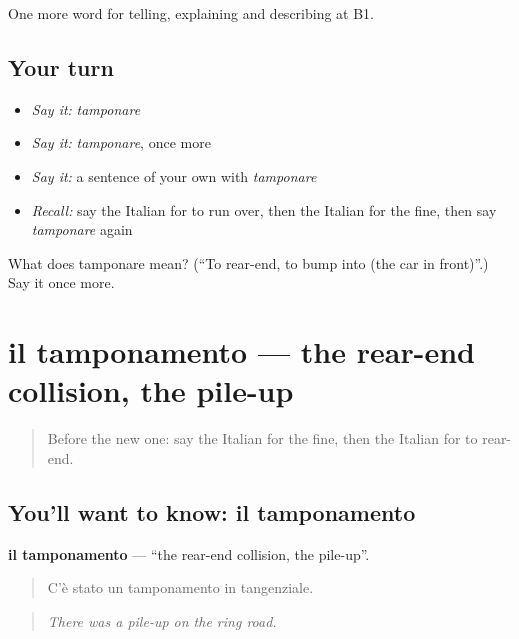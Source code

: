 \begin{grammarlens}[title={What you've built}]
One more word for telling, explaining and describing at B1.
\end{grammarlens}

\subsection*{Your turn}
\begin{itemize}
\raggedright
  \item \emph{Say it:} \emph{tamponare}
  \item \emph{Say it:} \emph{tamponare}, once more
  \item \emph{Say it:} a sentence of your own with \emph{tamponare}
  \item \emph{Recall:} say the Italian for to run over, then the Italian for the fine, then say \emph{tamponare} again
\end{itemize}

\begin{tcolorbox}[breakable,colback=teal!4,colframe=teal!35!black,title={Before you move on}]
What does tamponare mean? (\textquotedblleft{}To rear-end, to bump into (the car in front)\textquotedblright{}.) Say it once more.
\end{tcolorbox}
\section[il tamponamento]{il tamponamento — the rear-end collision, the pile-up}

\label{lesson:IT-C413-tamponamento}



\begin{quote}
Before the new one: say the Italian for the fine, then the Italian for to rear-end.
\end{quote}

\subsection*{You'll want to know: il tamponamento}
\textbf{il tamponamento} — \textquotedblleft{}the rear-end collision, the pile-up\textquotedblright{}.

\begin{quote}
C'è stato un tamponamento in tangenziale.
\end{quote}

\begin{quote}
\emph{There was a pile-up on the ring road.}
\end{quote}

